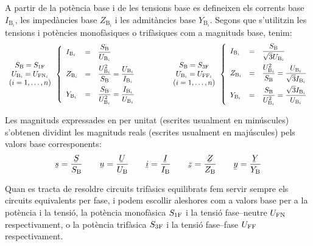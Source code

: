 A partir de la pot\`{e}ncia base i de les tensions base es
defineixen els corrents base $I_{\text{B}_i}$, les imped\`{a}ncies base $Z_{\text{B}_i}$ i les
admit\`{a}ncies base $Y_{\text{B}_i}$. Segons que s'utilitzin les tensions i pot\`{e}ncies monof\`{a}siques o trif\`{a}siques com a magnituds base, tenim:
\begin{equation}
\begin{array}{c}  S_\mathrm{B}=S_\mathrm{1F} \\ U_{\text{B}_i} = U_{\text{FN}_i} \\ (i=1,\ldots,n) \end{array}
\left\{
\begin{array}{lll}
   I_{\text{B}_i} &= &\dfrac{S_\mathrm{B}}{U_{\text{B}_i}} \\[2.5ex]
   Z_{\text{B}_i} &= &\dfrac{U_{\text{B}_i}^2}{S_\mathrm{B}} = \dfrac{U_{\text{B}_i}}{I_{\text{B}_i}} \\[2.5ex]
   Y_{\text{B}_i} &= &\dfrac{S_\mathrm{B}}{U_{\text{B}_i}^2} = \dfrac{I_{\text{B}_i}}{U_{\text{B}_i}}
\end{array}
\right.
\qquad\qquad
\begin{array}{c} S_\mathrm{B}=S_\mathrm{3F} \\ U_{\text{B}_i} = U_{\text{FF}_i} \\ (i=1,\ldots,n) \end{array}
\left\{
\begin{array}{lll}
   I_{\text{B}_i} &= &\dfrac{S_\mathrm{B}}{\sqrt{3} U_{\text{B}_i}} \\[2.5ex]
   Z_{\text{B}_i} &= &\dfrac{U_{\text{B}_i}^2}{S_\mathrm{B}}= \dfrac{U_{\text{B}_i}}{\sqrt{3} I_{\text{B}_i}} \\[2.5ex]
   Y_{\text{B}_i} &= &\dfrac{S_\mathrm{B}}{U_{\text{B}_i}^2} = \dfrac{\sqrt{3} I_{\text{B}_i}}{U_{\text{B}_i}}
\end{array}
\right.
\label{eq:bases_pu}
\end{equation}

Les magnituds expressades en per unitat (escrites usualment en min\'{u}scules) s'obtenen
dividint les magnituds reals (escrites usualment en maj\'{u}scules) pels valors base corresponents:
\begin{equation}
   \cmplx{s} = \frac{\cmplx{S}}{S\ped{B}} \qquad \cmplx{u} = \frac{\cmplx{U}}{U\ped{B}} \qquad \cmplx{i} = \frac{\cmplx{I}}{I\ped{B}} \qquad \cmplx{z} = \frac{\cmplx{Z}}{Z\ped{B}} \qquad \cmplx{y} = \frac{\cmplx{Y}}{Y\ped{B}}
\end{equation}

Quan es tracta de resoldre circuits trif\`{a}sics equilibrats fem servir sempre els circuits equivalents per fase, i podem escollir aleshores com a valors base per a la pot\`{e}ncia i la tensi\'{o}, la pot\`{e}ncia monof\`{a}sica $S_\mathrm{1F}$ i la tensi\'{o} fase--neutre $U_\mathrm{FN}$ respectivament, o la pot\`{e}ncia trif\`{a}sica $S_\mathrm{3F}$ i la tensi\'{o} fase--fase $U_\mathrm{FF}$ respectivament.


